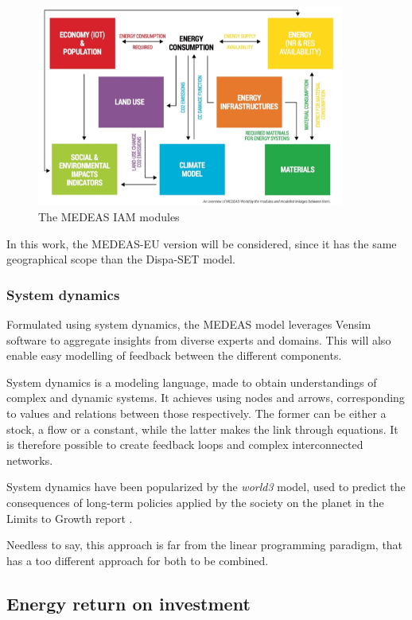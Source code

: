 \begin{figure}[h]
    \centering
    \includegraphics[width=0.9\textwidth]{resources/images/medeas.png}
    \caption{The MEDEAS IAM modules}
    \label{fig:medeas-modules}
\end{figure}

In this work, the MEDEAS-EU version will be considered, since it has the same geographical scope than the Dispa-SET model. 

\subsubsection{System dynamics}

Formulated using system dynamics, the MEDEAS model leverages Vensim software to aggregate insights from diverse experts and domains. This will also enable easy modelling of feedback between the different components.

System dynamics is a modeling language, made to obtain understandings of complex and dynamic systems. It achieves using nodes and arrows, corresponding to values and relations between those respectively. The former can be either a stock, a flow or a constant, while the latter makes the link through equations. It is therefore possible to create feedback loops and complex interconnected networks.

System dynamics have been popularized by the \textit{world3} model, used to predict the consequences of long-term policies applied by the society on the planet in the Limits to Growth report \cite{limits-to-growth}.

Needless to say, this approach is far from the linear programming paradigm, that has a too different approach for both to be combined.

\subsection{Energy return on investment}

